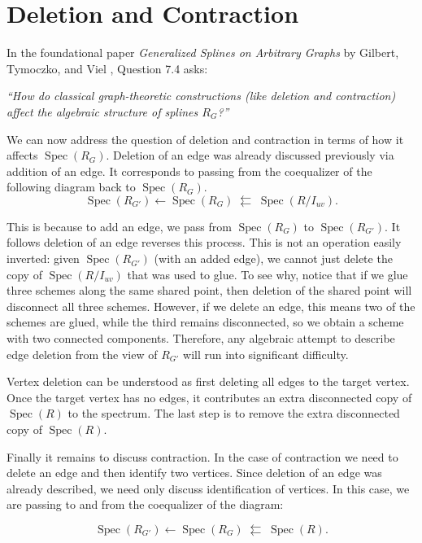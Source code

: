 \documentclass{article}
\DeclareMathOperator{\Spec}{Spec}
\begin{document}
\section{Deletion and Contraction}
In the foundational paper \textit{Generalized Splines on Arbitrary Graphs} by Gilbert, Tymoczko, and Viel \cite{gilbert2016generalized}, Question 7.4 asks:

\begin{center}
\emph{``How do classical graph-theoretic constructions (like deletion and contraction) affect the algebraic structure of splines $R_{G}$?''}
\end{center}

We can now address the question of deletion and contraction in terms of how it affects $\Spec(R_{G})$. Deletion of an edge was already discussed previously via addition of an edge. It corresponds to passing from the coequalizer of the following diagram back to $\Spec(R_{G})$.
\[
\Spec(R_{G'}) \leftarrow \Spec(R_{G}) \;\leftleftarrows\; \Spec(R/I_{uv}).
\]

This is because to add an edge, we pass from $\Spec(R_{G})$ to $\Spec(R_{G'})$. It follows deletion of an edge reverses this process. This is not an operation easily inverted: given $\Spec(R_{G'})$ (with an added edge), we cannot just delete the copy of $\Spec(R/I_{uv})$ that was used to glue. To see why, notice that if we glue three schemes along the same shared point, then deletion of the shared point will disconnect all three schemes. However, if we delete an edge, this means two of the schemes are glued, while the third remains disconnected, so we obtain a scheme with two connected components. Therefore, any algebraic attempt to describe edge deletion from the view of $R_{G'}$ will run into significant difficulty. 

Vertex deletion can be understood as first deleting all edges to the target vertex. Once the target vertex has no edges, it contributes an extra disconnected copy of $\Spec(R)$ to the spectrum. The last step is to remove the extra disconnected copy of $\Spec(R)$.

Finally it remains to discuss contraction. In the case of contraction we need to delete an edge and then identify two vertices. Since deletion of an edge was already described, we need only discuss identification of vertices. In this case, we are passing to and from the coequalizer of the diagram:

\[
\Spec(R_{G'}) \leftarrow \Spec(R_{G}) \;\leftleftarrows\; \Spec(R).
\]
\end{document}
